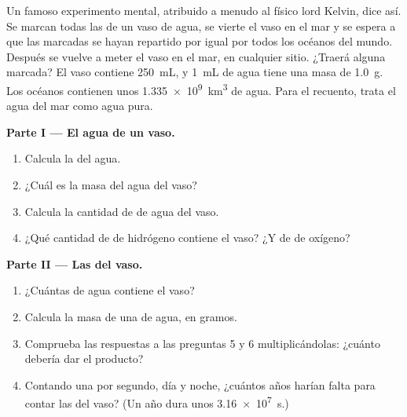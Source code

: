 \begin{problem}
\label{pb:g10:the-mole:1}
Un famoso experimento mental, atribuido a menudo al físico lord Kelvin,
dice así. Se marcan todas las  de un vaso de agua, se vierte el
vaso en el mar y se espera a que las  marcadas se hayan
repartido por igual por todos los océanos del mundo. Después se vuelve a
meter el vaso en el mar, en cualquier sitio. ¿Traerá alguna 
marcada? El vaso contiene \qty{250}{mL}, y \qty{1}{mL} de agua tiene una
masa de \qty{1.0}{g}. Los océanos contienen unos \qty{1.335e9}{km^3} de
agua. Para el recuento, trata el agua del mar como agua pura.

\medskip
\noindent\textbf{Parte I --- El agua de un vaso.}
\begin{enumerate}
  \item Calcula la  del agua.
  \item ¿Cuál es la masa del agua del vaso?
  \item Calcula la cantidad de  de agua del vaso.
  \item ¿Qué cantidad de  de hidrógeno contiene el vaso? ¿Y de
         de oxígeno?
\end{enumerate}

\medskip
\noindent\textbf{Parte II --- Las  del vaso.}
\begin{enumerate}[resume]
  \item ¿Cuántas  de agua contiene el vaso?
  \item Calcula la masa de una  de agua, en gramos.
  \item Comprueba las respuestas a las preguntas 5 y 6 multiplicándolas:
        ¿cuánto debería dar el producto?
  \item Contando una  por segundo, día y noche, ¿cuántos años
        harían falta para contar las  del vaso? (Un año dura
        unos \qty{3.16e7}{s}.)
\end{enumerate}


\end{problem}
